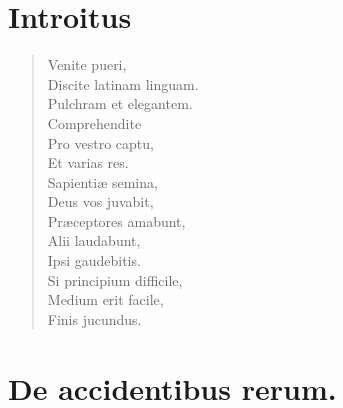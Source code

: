 \chapter{Introitus}

\begin{verse}

  Venite pueri,\\
  Discite latinam linguam.\\
  Pulchram et elegantem.\\
  Comprehendite \\
  Pro vestro captu,\\
  Et varias res.\\
  Sapientiæ semina,\\
  Deus vos juvabit,\\
  Præceptores amabunt,\\
  Alii laudabunt,\\
  Ipsi gaudebitis.\\
  Si principium difficile,\\
  Medium erit facile,\\
  Finis jucundus.\\
\end{verse}

\chapter{De accidentibus rerum.}


